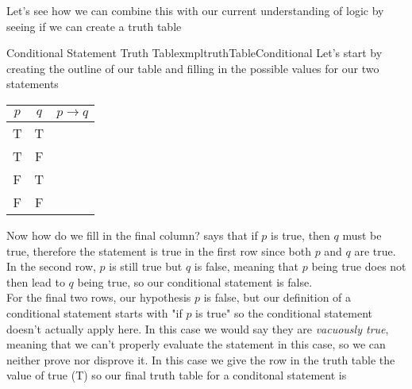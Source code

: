 Let's see how we can combine this with our current understanding of logic by seeing if we can create a truth table

\newpage
\begin{exmpl}[label={exmpl:truthTableConditional}]{Conditional Statement Truth Table}{xmpltruthTableConditional}
    Let's start by creating the outline of our table and filling in the possible values for our two statements
    \begin{center}
        \begin{tabular}{|c|c|c|}
            \hline
            $p$ & $q$ & $p \to q$ \\
            \hline
            T   & T   &           \\
            \hline
            T   & F   &           \\
            \hline
            F   & T   &           \\
            \hline
            F   & F   &           \\
            \hline
        \end{tabular}
    \end{center}
    \vspace{0.5cm}

    Now how do we fill in the final column?  says that if $p$ is true, then $q$ must be true, therefore the statement is true in the first row since both $p$ and $q$ are true.\\

    In the second row, $p$ is still true but $q$ is false, meaning that $p$ being true does not then lead to $q$ being true, so our conditional statement is false.\\

    For the final two rows, our hypothesis $p$ is false, but our definition of a conditional statement starts with "if $p$ is true" so the conditional statement doesn't actually apply here. In this case we would say they are \emph{vacuously true}, meaning that we can't properly evaluate the statement in this case, so we can neither prove nor disprove it. In this case we give the row in the truth table the value of true (T) so our final truth table for a conditonal statement is


\end{exmpl}
